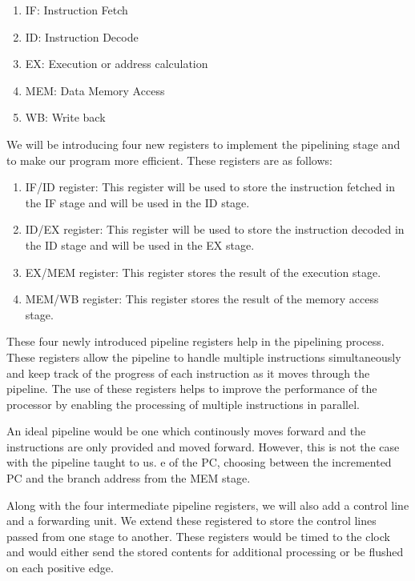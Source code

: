 \documentclass{article}
\begin{document}
\begin{enumerate}
    \item IF: Instruction Fetch
    \item ID: Instruction Decode 
    \item EX: Execution or address calculation
    \item MEM: Data Memory Access
    \item WB: Write back

\end{enumerate}

We will be introducing four new registers to implement the pipelining stage and to make our program more efficient. These registers are as follows:

\begin{enumerate}
    \item IF/ID register: This register will be used to store the instruction fetched in the IF stage and will be used in the ID stage.
    \item ID/EX register: This register will be used to store the instruction decoded in the ID stage and will be used in the EX stage.
    \item EX/MEM register: This register stores the result of the execution stage.
    \item MEM/WB register: This register stores the result of the memory access stage.
\end{enumerate}

These four newly introduced pipeline registers help in the pipelining process. These registers allow the pipeline to handle multiple instructions simultaneously and keep track of the progress of each instruction as it moves through the pipeline. The use of these registers helps to improve the performance of the processor by enabling the processing of multiple instructions in parallel.

An ideal pipeline would be one which continously moves forward and the instructions are only provided and moved forward. However, this is not the case with the pipeline taught to us. e of the PC, choosing between the
incremented PC and the branch address from the MEM stage. 

Along with the four intermediate pipeline registers, we will also add a control line and a forwarding unit. We extend these registered to store the control lines passed from one stage to another. These registers would be timed to the clock and would either send the stored contents for additional processing or be flushed on each positive edge.
\end{document}
